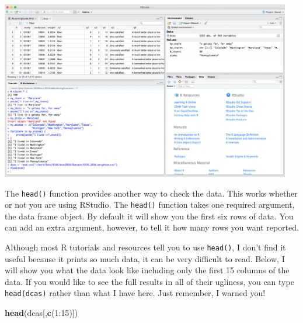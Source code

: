 \documentclass[]{article}
\newenvironment{Shaded}{\begin{snugshade}}{\end{snugshade}}
\newcommand{\KeywordTok}[1]{\textcolor[rgb]{0.13,0.29,0.53}{\textbf{{#1}}}}
\newcommand{\DecValTok}[1]{\textcolor[rgb]{0.00,0.00,0.81}{{#1}}}
\newcommand{\NormalTok}[1]{{#1}}
\begin{document}
\includegraphics[width=5in]{ch1_variables_and_data/images/View_function_screenshot}

The \texttt{head()} function provides another way to check the data.
This works whether or not you are using RStudio. The \texttt{head()}
function takes one required argument, the data frame object. By default
it will show you the first six rows of data. You can add an extra
argument, however, to tell it how many rows you want reported.

Although most R tutorials and resources tell you to use \texttt{head()},
I don't find it useful because it prints so much data, it can be very
difficult to read. Below, I will show you what the data look like
including only the first 15 columns of the data. If you would like to
see the full results in all of their ugliness, you can type
\texttt{head(dcas)} rather than what I have here. Just remember, I
warned you!

\begin{Shaded}
\begin{Highlighting}[]
\KeywordTok{head}\NormalTok{(dcas[,}\KeywordTok{c}\NormalTok{(}\DecValTok{1}\NormalTok{:}\DecValTok{15}\NormalTok{)])}
\end{Highlighting}
\end{Shaded}
\end{document}
